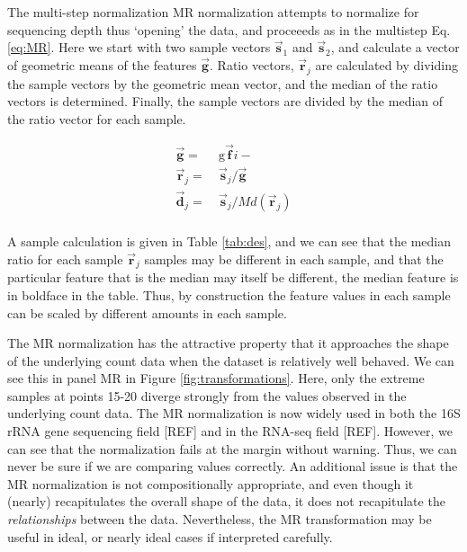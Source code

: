 \documentclass[onecolumn]{book}
\newcommand{\vect}[1]{\vec{\textbf{#1}}}
\theoremstyle{definition}
\theoremstyle{definition}
\theoremstyle{definition}
\theoremstyle{remark}
\begin{document}
The multi-step normalization MR normalization attempts to normalize for
sequencing depth thus `opening' the data, and proceeeds as in the
multistep Eq. \ref{eq:MR}. Here we start with two sample vectors
\(\vec{\textbf{s}}_1\) and \(\vec{\textbf{s}}_2\), and calculate a
vector of geometric means of the features \(\vec{\textbf{g}}\). Ratio
vectors, \(\vec{\textbf{r}}_j\) are calculated by dividing the sample
vectors by the geometric mean vector, and the median of the ratio
vectors is determined. Finally, the sample vectors are divided by the
median of the ratio vector for each sample.

\begin{equation}
    \begin{aligned}
        \vec{\textbf{g}} = &\ \mathrm{g}\vect{f}{i-}\\
        \vec{\textbf{r}}_j = &\ \vec{\textbf{s}}_j / \vec{\textbf{g}}\\
        \vec{\textbf{d}}_j = &\ \vec{\textbf{s}}_j / Md(\vec{\textbf{r}}_j)\\
    \end{aligned}
\label{eq:MR}
\end{equation}

A sample calculation is given in Table \ref{tab:des}, and we can see
that the median ratio for each sample \(\vec{\textbf{r}}_j\) samples may
be different in each sample, and that the particular feature that is the
median may itself be different, the median feature is in boldface in the
table. Thus, by construction the feature values in each sample can be
scaled by different amounts in each sample.

The MR normalization has the attractive property that it approaches the
shape of the underlying count data when the dataset is relatively well
behaved. We can see this in panel MR in Figure
\ref{fig:transformations}. Here, only the extreme samples at points
15-20 diverge strongly from the values observed in the underlying count
data. The MR normalization is now widely used in both the 16S rRNA gene
sequencing field {[}REF{]} and in the RNA-seq field {[}REF{]}. However,
we can see that the normalization fails at the margin without warning.
Thus, we can never be sure if we are comparing values correctly. An
additional issue is that the MR normalization is not compositionally
appropriate, and even though it (nearly) recapitulates the overall shape
of the data, it does not recapitulate the \emph{relationships} between
the data. Nevertheless, the MR transformation may be useful in ideal, or
nearly ideal cases if interpreted carefully.
\end{document}
